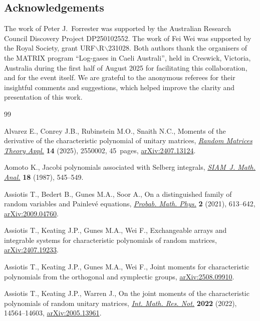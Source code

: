 \documentclass[pdftex]{sigma}
\numberwithin{equation}{section}
\theoremstyle{definition}
\begin{document}
\subsection*{Acknowledgements}
The work of Peter J.~Forrester was supported by the Australian Research Council Discovery Project
DP250102552. The work of Fei Wei was supported by the Royal Society, grant URF$\backslash$R$\backslash$231028. Both authors thank the organisers of the MATRIX program ``Log-gases in Caeli Australi'', held in Creswick, Victoria, Australia during the first half of August 2025 for facilitating this collaboration, and for the event itself. We are grateful to the anonymous referees for their insightful comments and suggestions, which helped improve the clarity and presentation of this work.

\begin{thebibliography}{99}
\footnotesize\itemsep=0pt

Alvarez E., Conrey J.B., Rubinstein M.O., Snaith N.C., Moments of the
 derivative of the characteristic polynomial of unitary matrices,
 \href{https://doi.org/10.1142/S2010326325500029}{\textit{Random Matrices
 Theory Appl.}} \textbf{14} (2025), 2550002, 45~pages,
 \href{http://arxiv.org/abs/2407.13124}{arXiv:2407.13124}.

Aomoto K., Jacobi polynomials associated with {S}elberg integrals,
 \href{https://doi.org/10.1137/0518042}{\textit{SIAM~J. Math. Anal.}}
 \textbf{18} (1987), 545--549.

Assiotis T., Bedert B., Gunes M.A., Soor A., On a distinguished family of
 random variables and {P}ainlev\'e equations,
 \href{https://doi.org/10.2140/pmp.2021.2.613}{\textit{Probab. Math. Phys.}}
 \textbf{2} (2021), 613--642,
 \href{http://arxiv.org/abs/2009.04760}{arXiv:2009.04760}.

Assiotis T., Keating J.P., Gunes M.A., Wei F., Exchangeable arrays and
 integrable systems for characteristic polynomials of random matrices,
 \href{http://arxiv.org/abs/2407.19233}{arXiv:2407.19233}.

Assiotis T., Keating J.P., Gunes M.A., Wei F., Joint moments for characteristic
 polynomials from the orthogonal and symplectic groups,
 \href{http://arxiv.org/abs/2508.09910}{arXiv:2508.09910}.

Assiotis T., Keating J.P., Warren J., On the joint moments of the
 characteristic polynomials of random unitary matrices,
 \href{https://doi.org/10.1093/imrn/rnab336}{\textit{Int. Math. Res. Not.}}
 \textbf{2022} (2022), 14564--14603,
 \href{http://arxiv.org/abs/2005.13961}{arXiv:2005.13961}.


\end{thebibliography}
\end{document}
